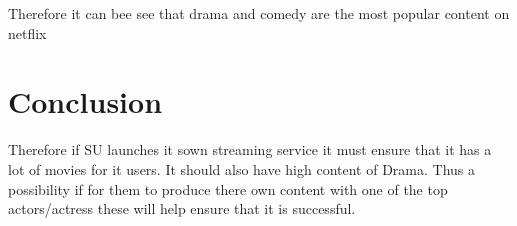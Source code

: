 \documentclass[12pt,preprint, authoryear]{elsarticle}
\numberwithin{equation}{section}
\numberwithin{figure}{section}
\numberwithin{table}{section}
\begin{document}
Therefore it can bee see that drama and comedy are the most popular
content on netflix

\hypertarget{conclusion}{%
\section{Conclusion}\label{conclusion}}

Therefore if SU launches it sown streaming service it must ensure that
it has a lot of movies for it users. It should also have high content of
Drama. Thus a possibility if for them to produce there own content with
one of the top actors/actress these will help ensure that it is
successful.


\end{document}
